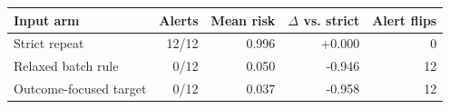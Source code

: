 \begin{tabular}{lrrrr}
\toprule
Input arm & Alerts & Mean risk & $\Delta$ vs. strict & Alert flips\\
\midrule
Strict repeat & 12/12 & 0.996 & +0.000 & 0\\
Relaxed batch rule & 0/12 & 0.050 & -0.946 & 12\\
Outcome-focused target & 0/12 & 0.037 & -0.958 & 12\\
\bottomrule
\end{tabular}

